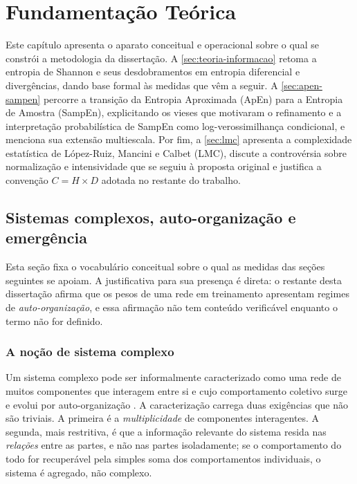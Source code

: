 
\chapter{Fundamentação Teórica}
\label{ch:fundamentacao}


Este capítulo apresenta o aparato conceitual e operacional sobre o qual
se constrói a metodologia da dissertação. A
\autoref{sec:teoria-informacao} retoma a entropia de Shannon e seus
desdobramentos em entropia diferencial e divergências, dando base
formal às medidas que vêm a seguir. A \autoref{sec:apen-sampen}
percorre a transição da Entropia Aproximada (ApEn) para a Entropia de
Amostra (SampEn), explicitando os vieses que motivaram o refinamento e
a interpretação probabilística de SampEn como log-verossimilhança
condicional, e menciona sua extensão multiescala.
Por fim, a
\autoref{sec:lmc} apresenta a complexidade estatística de López-Ruiz,
Mancini e Calbet (LMC), discute a controvérsia sobre normalização e
intensividade que se seguiu à proposta original e justifica a
convenção $C = H \times D$ adotada no restante do trabalho.

\section{Sistemas complexos, auto-organização e emergência}
\label{sec:sistemas-complexos}

Esta seção fixa o vocabulário conceitual sobre o qual as medidas das seções
seguintes se apoiam. A justificativa para sua presença é direta: o restante
desta dissertação afirma que os pesos de uma rede em treinamento apresentam
regimes de \emph{auto-organização}, e essa afirmação não tem conteúdo
verificável enquanto o termo não for definido.

\subsection{A noção de sistema complexo}

Um sistema complexo pode ser informalmente caracterizado como uma rede de
muitos componentes que interagem entre si e cujo comportamento coletivo surge e
evolui por auto-organização \cite{sayama2015}. A caracterização carrega duas
exigências que não são triviais. A primeira é a \emph{multiplicidade} de
componentes interagentes. A segunda, mais restritiva, é que a informação
relevante do sistema resida nas \emph{relações} entre as partes, e não nas
partes isoladamente; se o comportamento do todo for recuperável pela simples
soma dos comportamentos individuais, o sistema é agregado, não complexo.

